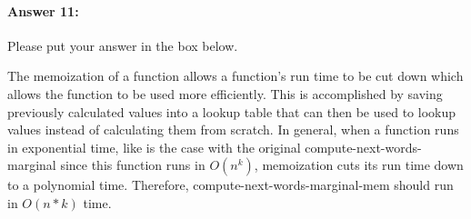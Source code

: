 \documentclass[10pt]{article}
\newenvironment{AnswerBox}{\begin{mdframed}[style=simple]}{\end{mdframed}}
\begin{document}
\paragraph{Answer 11:} Please put your answer in the box below.

\begin{AnswerBox}%

 The memoization of a function allows a function's run time to be cut down which allows the function to be used more efficiently. This is accomplished by saving previously calculated values into a lookup table that can then be used to lookup values instead of calculating them from scratch. In general, when a function runs in exponential time, like is the case with the original compute-next-words-marginal since this function runs in $O(n^k)$, memoization cuts its run time down to a polynomial time. Therefore, compute-next-words-marginal-mem should run in $O(n*k)$ time.   

\end{AnswerBox}%

\end{document}
